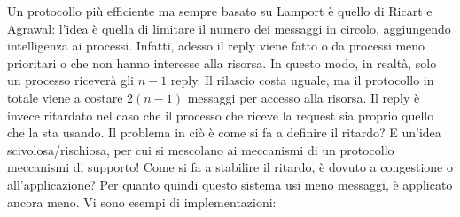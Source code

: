 Un protocollo più efficiente ma sempre basato su Lamport è quello di Ricart e Agrawal: l'idea è quella di limitare il
numero dei messaggi in circolo, aggiungendo intelligenza ai processi. Infatti, adesso il reply viene fatto o da
processi meno prioritari o che non hanno interesse alla risorsa. In questo modo, in realtà, solo un processo riceverà
gli $n - 1$ reply. Il rilascio costa uguale, ma il protocollo in totale viene a costare $2(n - 1)$ messaggi per accesso
alla risorsa. Il reply è invece ritardato nel caso che il processo che riceve la request sia proprio quello che la
sta usando.
Il problema in ciò è come si fa a definire il ritardo? E un'idea scivolosa/rischiosa, per cui si mescolano ai
meccanismi di un protocollo meccanismi di supporto!
Come si fa a stabilire il ritardo, è dovuto a congestione o all'applicazione? Per quanto quindi questo sistema usi
meno messaggi, è applicato ancora meno.
Vi sono esempi di implementazioni:
